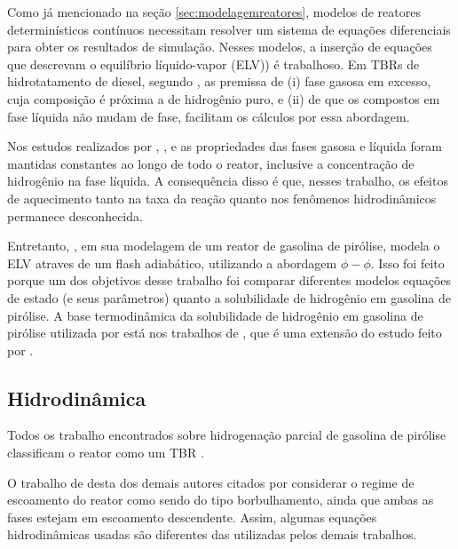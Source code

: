 Como já mencionado na seção \autoref{sec:modelagemreatores}, modelos de reatores
determinísticos contínuos necessitam resolver um sistema de equações
diferenciais para obter os resultados de simulação. Nesses modelos, a inserção
de equações que descrevam o equilíbrio líquido-vapor (ELV)) é trabalhoso. Em
TBRs de hidrotatamento de diesel, segundo , as premissa de (i)
fase gasosa em excesso, cuja composição é próxima a de hidrogênio puro, e (ii)
de que os compostos em fase líquida não mudam de fase, facilitam os cálculos por
essa abordagem.

Nos estudos realizados por ,
,  e
 as propriedades das fases gasosa e líquida foram
mantidas constantes ao longo de todo o reator, inclusive a concentração de
hidrogênio na fase líquida. A consequência disso é que, nesses trabalho, os
efeitos de aquecimento tanto na taxa da reação quanto nos fenômenos
hidrodinâmicos permanece desconhecida.

Entretanto, , em sua modelagem de um reator de
gasolina de pirólise, modela o ELV atraves de um flash
adiabático, utilizando a abordagem $\phi-\phi$. Isso foi feito porque um dos
objetivos desse trabalho foi comparar diferentes modelos equações de estado (e
seus parâmetros) quanto a solubilidade de hidrogênio em gasolina de pirólise. A
base termodinâmica da solubilidade de hidrogênio em gasolina de pirólise
utilizada por  está nos trabalhos de
, que é uma extensão do estudo feito por
.


\subsection{Hidrodinâmica} \label{sec:hidrodinamica}
Todos os trabalho encontrados sobre hidrogenação parcial de gasolina de pirólise
classificam o reator como um TBR \cite{Arpornwichanop2002, Authayanun2008,
Mostoufi2005a, Arpornwichanop2008, Rojas2014a}. 

O trabalho de  desta dos demais autores citados por
considerar o regime de escoamento do reator como sendo do tipo borbulhamento,
ainda que ambas as fases estejam em escoamento descendente. Assim, algumas
equações hidrodinâmicas usadas são diferentes das utilizadas pelos demais
trabalhos.


